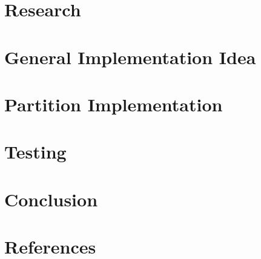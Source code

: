\documentclass{article} %
\begin{document}
{{\section{Research}\label{sect:research}}}




{{\section{General Implementation Idea}\label{sect:generalImpl}}}




\clearpage
{{\section{Partition Implementation}\label{sect:implementation}}}



\clearpage
{{\section{Testing}\label{sect:testing}}}



\hspace{10px}
{{\section{Conclusion}\label{sect:conclusion}}}



\clearpage
{{\section{References}\label{sect:biblio}}}

\end{document}
